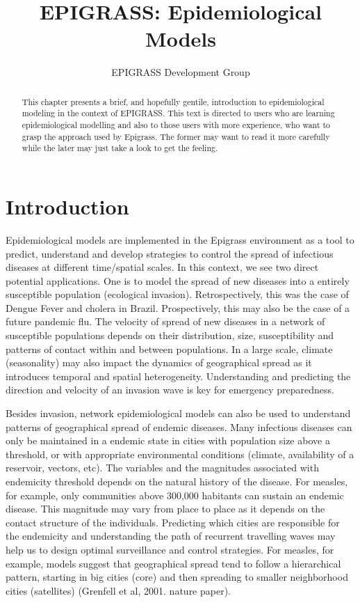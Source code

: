 \documentclass[a4paper,12pt]{article}
\title{EPIGRASS: Epidemiological Models}
\author{EPIGRASS Development Group}
\begin{document}
\maketitle

\begin{abstract}
This chapter presents a brief, and hopefully gentile, introduction to epidemiological modeling in the context of EPIGRASS. This text is directed to users who are learning epidemiological modelling and also to those users with more experience, who want to grasp the approach used by Epigrass. The former may want to read it more carefully while the later may just take a look to get the feeling.
\end{abstract}

\section{Introduction}
Epidemiological models are implemented in the Epigrass environment as a tool to predict, understand and develop strategies to control the spread of infectious diseases at different time/spatial scales. In this context, we see two direct potential applications. One is to model the spread of new diseases into a entirely susceptible population (ecological invasion). Retrospectively, this was the case of Dengue Fever and cholera in Brazil. Prospectively, this may also be the case of a future pandemic flu. The velocity of spread of new diseases in a network of susceptible populations depends on their distribution, size, susceptibility and patterns of contact within and between populations. In a large scale, climate (seasonality) may also impact the dynamics of geographical spread as it introduces temporal and spatial heterogeneity. Understanding and predicting the direction and velocity of an invasion wave is key for emergency preparedness. 

Besides invasion, network epidemiological models can also be used to understand patterns of geographical spread of endemic diseases. Many infectious diseases can only be maintained in a endemic state in cities with population size above a threshold, or with appropriate environmental conditions (climate, availability of a reservoir, vectors, etc). The variables and the magnitudes associated with endemicity threshold depends on the natural history of the disease. For measles, for example, only communities above 300,000 habitants can sustain an endemic disease. This magnitude may vary from place to place as it depends on the contact structure of the individuals. Predicting which cities are responsible for the endemicity and understanding the path of recurrent travelling waves may help us to design optimal surveillance and control strategies. For measles, for example, models suggest that geographical spread tend to follow a hierarchical pattern, starting in big cities (core) and then spreading to smaller neighborhood cities (satellites) (Grenfell et al, 2001. nature paper). 
\end{document}
